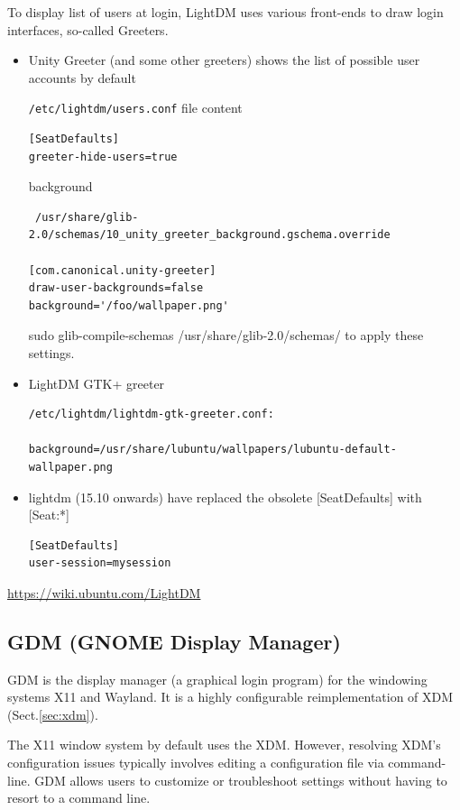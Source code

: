 To display list of users at login, LightDM uses various front-ends to draw login
interfaces, so-called Greeters.
\begin{itemize}
  \item  Unity Greeter (and some other greeters) shows the list of possible user
  accounts by default

\verb!/etc/lightdm/users.conf! file content  
\begin{verbatim}
[SeatDefaults]
greeter-hide-users=true

\end{verbatim}  

background
  
\begin{verbatim}
 /usr/share/glib-2.0/schemas/10_unity_greeter_background.gschema.override
 
[com.canonical.unity-greeter]
draw-user-backgrounds=false
background='/foo/wallpaper.png'
\end{verbatim}
 sudo glib-compile-schemas /usr/share/glib-2.0/schemas/ to apply these settings.
  
  \item LightDM GTK+ greeter
  
\begin{verbatim}
/etc/lightdm/lightdm-gtk-greeter.conf:

background=/usr/share/lubuntu/wallpapers/lubuntu-default-wallpaper.png
\end{verbatim}

  \item lightdm (15.10 onwards) have replaced the obsolete [SeatDefaults] with [Seat:*]
\begin{verbatim}
[SeatDefaults]
user-session=mysession
\end{verbatim}
  

\end{itemize}
\url{https://wiki.ubuntu.com/LightDM}


\subsection{GDM (GNOME Display Manager)}
\label{sec:GDM}

GDM is the display manager (a graphical login program) for the windowing systems
X11 and Wayland. It is a highly configurable reimplementation of XDM
(Sect.\ref{sec:xdm}). 

The X11 window system by default uses the XDM. However, resolving XDM's
configuration issues typically involves editing a configuration file via
command-line. GDM allows users to customize or troubleshoot settings without
having to resort to a command line.


